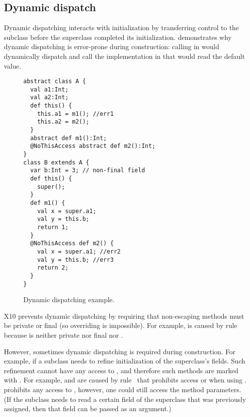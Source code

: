 \subsection{Dynamic dispatch}
Dynamic dispatching interacts with initialization by transferring control to the subclass
    before the superclass completed its initialization.
 demonstrates why dynamic dispatching is error-prone during construction:
    calling  in  would dynamically dispatch and
    call the implementation in 
    that would read the default value.



\begin{figure}
\begin{lstlisting}
abstract class A {
  val a1:Int;
  val a2:Int;
  def this() {
    this.a1 = m1(); //err1
    this.a2 = m2();
  }
  abstract def m1():Int;
  @NoThisAccess abstract def m2():Int;
}
class B extends A {
  var b:Int = 3; // non-final field
  def this() {
    super();
  }
  def m1() {
    val x = super.a1;
    val y = this.b;
    return 1;
  }
  @NoThisAccess def m2() {
    val x = super.a1; //err2
    val y = this.b; //err3
    return 2;
  }
}
\end{lstlisting}
\caption{Dynamic dispatching example.
    }
\label{Figure:Dynamic-dispatch}
\end{figure}


X10 prevents dynamic dispatching by requiring that non-escaping methods
    must be private or final
    (so overriding is impossible).
For example,  is caused by rule~
    because  is neither private nor final nor .

However, sometimes dynamic dispatching is required during construction.
For example, if a subclass needs to refine initialization
    of the superclass's fields.
Such refinement cannot have any access to \this, and therefore
    such methods are marked with .
For example,  and  are caused by rule~ that prohibits access \this or 
    when using .
 prohibits any access to \this,
    however, one could still access the method parameters.
(If the subclass needs to read a certain field of the superclass that was previously assigned,
    then that field can be passed as an argument.) %


